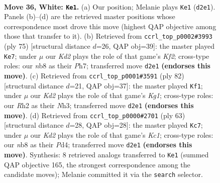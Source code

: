 \documentclass[11pt]{article}
\begin{document}
\clearpage

\begin{figure}[p]\centering
\begin{subfigure}{0.46\textwidth}\centering
\resizebox{\linewidth}{!}{%
\newchessgame
\chessboard[
  setfen={1n5r/5k2/1p1p4/1P1P4/p1p3P1/7P/1P1K3R/8 w - - 1 36},
  showmover=false,
  pgfstyle=straightmove, color=movearrow, markmove={d2-e1}
]}
\caption{}
\end{subfigure}\hfill
\begin{subfigure}{0.46\textwidth}\centering
\resizebox{\linewidth}{!}{%
\newchessgame
\chessboard[
  setfen={r7/p2P1kpp/1p6/1P6/4p3/1KP5/6PP/R7 b - - 0 38},
  showmover=false,
  pgfstyle=straightmove, color=movearrow, markmove={f7-e7}
]}
\caption{}
\end{subfigure}
\\[4pt]
\begin{subfigure}{0.46\textwidth}\centering
\resizebox{\linewidth}{!}{%
\newchessgame
\chessboard[
  setfen={8/R5pk/1p6/1P2np1p/7P/6PN/P3r3/6K1 w - - 1 42},
  showmover=false,
  pgfstyle=straightmove, color=movearrow, markmove={g1-f1}
]}
\caption{}
\end{subfigure}\hfill
\begin{subfigure}{0.46\textwidth}\centering
\resizebox{\linewidth}{!}{%
\newchessgame
\chessboard[
  setfen={2k1r3/pp6/8/8/P2pp1P1/8/2P2P2/4R1K1 b - - 0 32},
  showmover=false,
  pgfstyle=straightmove, color=movearrow, markmove={c8-c7}
]}
\caption{}
\end{subfigure}
\caption{\textbf{Move 36, White: \texttt{Ke1}.} (a) Our position; Melanie plays \texttt{Ke1} (\texttt{d2e1}). Panels (b)--(d) are the retrieved master positions whose correspondence most drove this move (highest QAP objective among those that transfer to it). (b) Retrieved from \texttt{ccrl\_top\_p0002\#3993} (ply 75) [structural distance $d$=26, QAP obj=39]: the master played \texttt{Ke7}; under $\mu$ our \emph{Kd2} plays the role of that game's \emph{Kf2}; cross-type roles: our \emph{n}b8 as their \emph{P}h7; transferred move \texttt{d2e1} \textbf{(endorses this move)}. (c) Retrieved from \texttt{ccrl\_top\_p0001\#3591} (ply 82) [structural distance $d$=21, QAP obj=37]: the master played \texttt{Kf1}; under $\mu$ our \emph{Kd2} plays the role of that game's \emph{Kg1}; cross-type roles: our \emph{R}h2 as their \emph{N}h3; transferred move \texttt{d2e1} \textbf{(endorses this move)}. (d) Retrieved from \texttt{ccrl\_top\_p0000\#2701} (ply 63) [structural distance $d$=28, QAP obj=28]: the master played \texttt{Kc7}; under $\mu$ our \emph{Kd2} plays the role of that game's \emph{Kc1}; cross-type roles: our \emph{n}b8 as their \emph{P}d4; transferred move \texttt{d2e1} \textbf{(endorses this move)}. Synthesis: 8 retrieved analogs transferred to \texttt{Ke1} (summed QAP objective 165, the strongest correspondence among the candidate moves); Melanie committed it via the \texttt{search} selector.}
\label{fig:thought-m70}
\end{figure}
\end{document}
